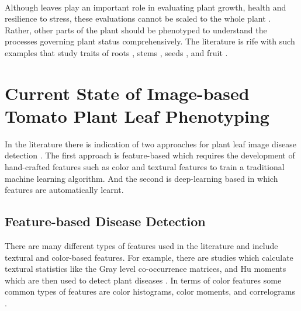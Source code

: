 \paragraph{}
Although leaves play an important role in evaluating plant growth, health and resilience to stress, these evaluations cannot be scaled to the whole plant \cite{zhangHighthroughputPhenotypingPlant2023}. Rather, other parts of the plant should be phenotyped to understand the processes governing plant status comprehensively. The literature is rife with such examples that study traits of roots \cite{bodnerHyperspectralImagingNovel2018}, stems \cite{daschoudhuryAutomatedStemAngle2017}, seeds \cite{zhangHighThroughputPhenotypingSeed2018}, and fruit \cite{abebeImageBasedHighThroughputPhenotyping2023}.

\section{Current State of Image-based Tomato Plant Leaf Phenotyping}

In the literature there is indication of two approaches  for plant leaf image disease detection \cite{ahmedLeafImagebasedPlant2021a}. The first approach is feature-based which requires the development of hand-crafted features such as color and textural features to train a traditional machine learning algorithm. And the second is deep-learning based in which features are automatically learnt.

\subsection{Feature-based Disease Detection}
There are many different types of features used in the literature and include textural and color-based features. For example, there are studies which calculate textural statistics like the Gray level co-occurrence matrices, and Hu moments which are then used to detect plant diseases \cite{haralickTexturalFeaturesImage1973, kimClassificationGrapefruitPeel, arivazhaganDetectionUnhealthyRegion2013, ahmedLeafImagebasedPlant2021a, mokhtarSVMBasedDetectionTomato2015}. In terms of color features some common types of features are color histograms, color moments, and correlograms \cite{patilPlantLeafDisease2024, huangContentbasedImageRetrieval2010, kimClassificationGrapefruitPeel}.

